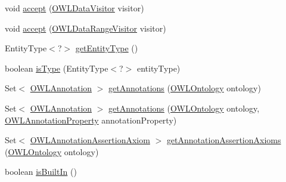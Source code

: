 \begin{DoxyCompactItemize}
\item 
void \hyperlink{classuk_1_1ac_1_1manchester_1_1cs_1_1owl_1_1owlapi_1_1_o_w_l2_datatype_impl_a1dbc53696b6668dbbd98d41ddb721df9}{accept} (\hyperlink{interfaceorg_1_1semanticweb_1_1owlapi_1_1model_1_1_o_w_l_data_visitor}{O\-W\-L\-Data\-Visitor} visitor)
\item 
void \hyperlink{classuk_1_1ac_1_1manchester_1_1cs_1_1owl_1_1owlapi_1_1_o_w_l2_datatype_impl_a378260a191643d5503348b1763720653}{accept} (\hyperlink{interfaceorg_1_1semanticweb_1_1owlapi_1_1model_1_1_o_w_l_data_range_visitor}{O\-W\-L\-Data\-Range\-Visitor} visitor)
\item 
Entity\-Type$<$?$>$ \hyperlink{classuk_1_1ac_1_1manchester_1_1cs_1_1owl_1_1owlapi_1_1_o_w_l2_datatype_impl_a021e29e250d710cbf5343686cecf8648}{get\-Entity\-Type} ()
\item 
boolean \hyperlink{classuk_1_1ac_1_1manchester_1_1cs_1_1owl_1_1owlapi_1_1_o_w_l2_datatype_impl_ab47d6b18cc7ee96a9f272c7c3b025930}{is\-Type} (Entity\-Type$<$?$>$ entity\-Type)
\item 
Set$<$ \hyperlink{interfaceorg_1_1semanticweb_1_1owlapi_1_1model_1_1_o_w_l_annotation}{O\-W\-L\-Annotation} $>$ \hyperlink{classuk_1_1ac_1_1manchester_1_1cs_1_1owl_1_1owlapi_1_1_o_w_l2_datatype_impl_aa6ede42bf9bd1b78ee589f1f10fcd7e3}{get\-Annotations} (\hyperlink{interfaceorg_1_1semanticweb_1_1owlapi_1_1model_1_1_o_w_l_ontology}{O\-W\-L\-Ontology} ontology)
\item 
Set$<$ \hyperlink{interfaceorg_1_1semanticweb_1_1owlapi_1_1model_1_1_o_w_l_annotation}{O\-W\-L\-Annotation} $>$ \hyperlink{classuk_1_1ac_1_1manchester_1_1cs_1_1owl_1_1owlapi_1_1_o_w_l2_datatype_impl_ab6bd3b0f47ebfc193eab1dde3511639e}{get\-Annotations} (\hyperlink{interfaceorg_1_1semanticweb_1_1owlapi_1_1model_1_1_o_w_l_ontology}{O\-W\-L\-Ontology} ontology, \hyperlink{interfaceorg_1_1semanticweb_1_1owlapi_1_1model_1_1_o_w_l_annotation_property}{O\-W\-L\-Annotation\-Property} annotation\-Property)
\item 
Set$<$ \hyperlink{interfaceorg_1_1semanticweb_1_1owlapi_1_1model_1_1_o_w_l_annotation_assertion_axiom}{O\-W\-L\-Annotation\-Assertion\-Axiom} $>$ \hyperlink{classuk_1_1ac_1_1manchester_1_1cs_1_1owl_1_1owlapi_1_1_o_w_l2_datatype_impl_aacd06494f152f3d10ab22668d6a12f63}{get\-Annotation\-Assertion\-Axioms} (\hyperlink{interfaceorg_1_1semanticweb_1_1owlapi_1_1model_1_1_o_w_l_ontology}{O\-W\-L\-Ontology} ontology)
\item 
boolean \hyperlink{classuk_1_1ac_1_1manchester_1_1cs_1_1owl_1_1owlapi_1_1_o_w_l2_datatype_impl_aa20b11d8b807453da6af983ffe160af7}{is\-Built\-In} ()

\end{DoxyCompactItemize}

